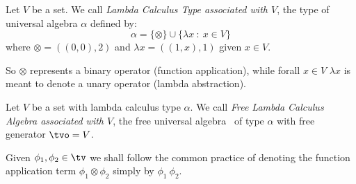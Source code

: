 \begin{defin}\label{logic:def:LAM:type}
Let $V$ be a set. We call {\em Lambda Calculus Type associated
with $V$}, the type of universal algebra $\alpha$ defined by:
    \[
    \alpha=\{\otimes\}\cup\{\lambda x\ :\ x\in V\}
    \]
where $\otimes=((0,0),2)$ and $\lambda x=((1,x),1)$ given $x\in V$.
\end{defin}

So $\otimes$ represents a binary operator (function application),
while forall $x\in V$ $\lambda x$ is meant to denote a unary operator 
(lambda abstraction).


\begin{defin}\label{logic:def:LAM:free:algebra}
Let $V$ be a set with lambda calculus type $\alpha$. We call {\em
Free Lambda Calculus Algebra associated with $V$},
the free universal algebra \tv\ of type $\alpha$ with free generator
$\tvo=V$.
\end{defin}

Given $\phi_{1}, \phi_{2}\in\tv$ we shall follow the common practice of 
denoting the function application term $\phi_{1}\otimes \phi_{2}$ 
simply by $\phi_{1}\ \phi_{2}$.


